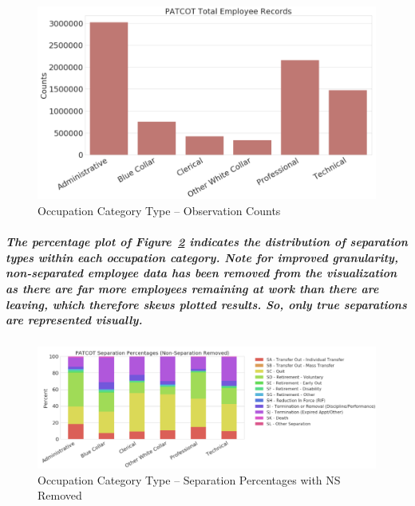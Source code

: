 \documentclass[10pt]{article}
\begin{document}
\subparagraph{}
\begin{figure}[H]
\centering
\includegraphics[width=\linewidth]{PATCOTOccCounts.png}
\caption{Occupation Category Type – Observation Counts}
\label{fig:PATCOTOccCounts}
\end{figure}

\subparagraph{The percentage plot of Figure~\ref{fig:PATCOTSepPercentages} indicates the distribution of separation types within each occupation category. Note for improved granularity, non-separated employee data has been removed from the visualization as there are far more employees remaining at work than there are leaving, which therefore skews plotted results. So, only true separations are represented visually.}

\subparagraph{}
\begin{figure}[H]
\centering
\includegraphics[width=\linewidth]{PATCOTSepPercentages.png}
\caption{Occupation Category Type – Separation Percentages with NS Removed}
\label{fig:PATCOTSepPercentages}
\end{figure}
 
\end{document}
